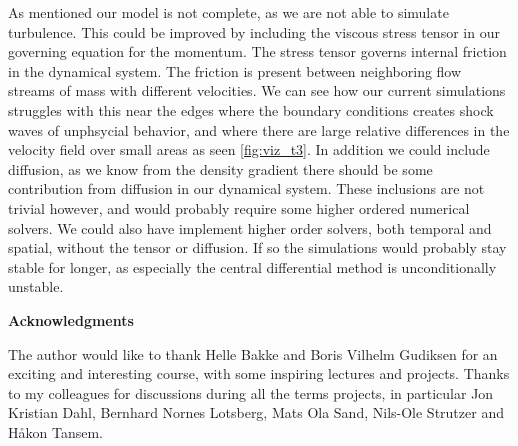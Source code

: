 \documentclass[11pt,a4paper,twocolumn,titlepage]{article}
\begin{document}
As mentioned our model is not complete, as we are not able to simulate turbulence. This could be improved by including the viscous stress tensor in our governing equation for the momentum. The stress tensor governs internal friction in the dynamical system. The friction is present between neighboring flow streams of mass with different velocities. We can see how our current simulations struggles with this near the edges where the boundary conditions creates shock waves of unphsycial behavior, and where there are large relative differences in the velocity field over small areas as seen \cref{fig:viz_t3}. In addition we could include diffusion, as we know from the density gradient there should be some contribution from diffusion in our dynamical system. These inclusions are not trivial however, and would probably require some higher ordered numerical solvers. We could also have implement higher order solvers, both temporal and spatial, without the tensor or diffusion. If so the simulations would probably stay stable for longer, as especially the central differential method is unconditionally unstable.

\vspace{0.2 cm}
\noindent
\textbf{\large Acknowledgments}

The author would like to thank Helle Bakke and Boris Vilhelm Gudiksen for an exciting and interesting course, with some inspiring lectures and projects. Thanks to my colleagues for discussions during all the terms projects, in particular Jon Kristian Dahl, Bernhard Nornes Lotsberg, Mats Ola Sand, Nils-Ole Strutzer and Håkon Tansem.
\vspace{0.2cm}


\end{document}
